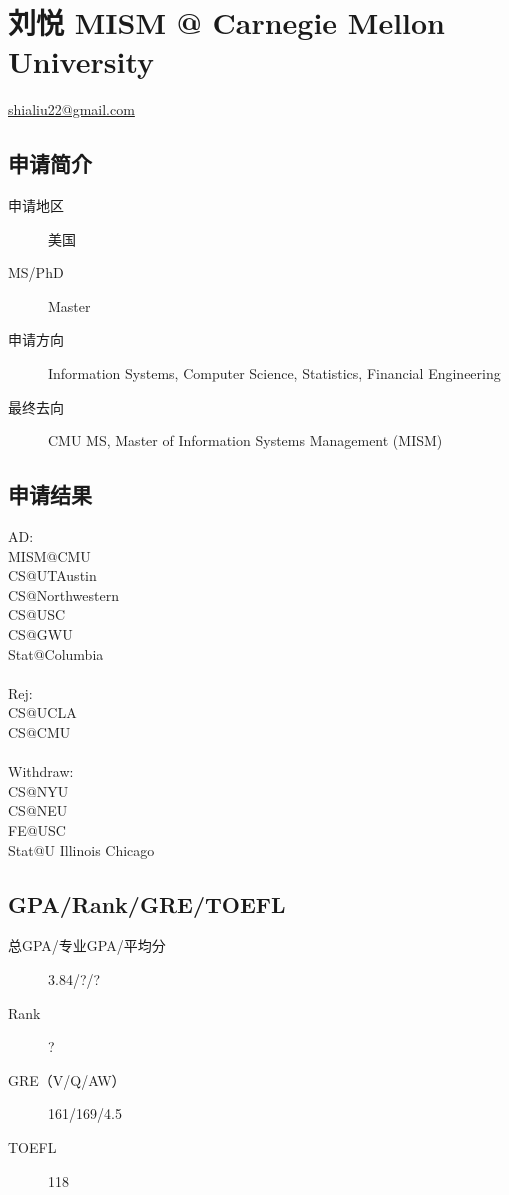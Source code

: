 \documentclass[11pt,fleqn,openany]{book} %
\begin{document}
\section{刘悦 MISM @ Carnegie Mellon University}
\hfill \href{mailto:shialiu22@gmail.com}{shialiu22@gmail.com}

\noindent\begin{minipage}[t]{0.45\textwidth}
\subsection*{申请简介}
\begin{description}
\item[申请地区] 美国
\item[MS/PhD] Master
\item[申请方向] Information Systems, Computer Science, Statistics, Financial Engineering
\item[最终去向] CMU MS, Master of Information Systems Management (MISM)
\end{description}
\end{minipage}
\hfill
\begin{minipage}[t]{0.45\textwidth}
\subsection*{申请结果}
\noindent AD:\\
MISM@CMU\\
CS@UTAustin\\
CS@Northwestern\\
CS@USC\\
CS@GWU\\
Stat@Columbia\\
\\
Rej:\\
CS@UCLA\\
CS@CMU\\
\\
Withdraw:\\
CS@NYU\\
CS@NEU\\
FE@USC\\
Stat@U Illinois Chicago
\end{minipage}
\subsection*{GPA/Rank/GRE/TOEFL}
\begin{description}
\item[总GPA/专业GPA/平均分] 3.84/?/?
\item[Rank] ?
\item[GRE（V/Q/AW）] 161/169/4.5
\item[TOEFL] 118
\end{description}
\end{document}
